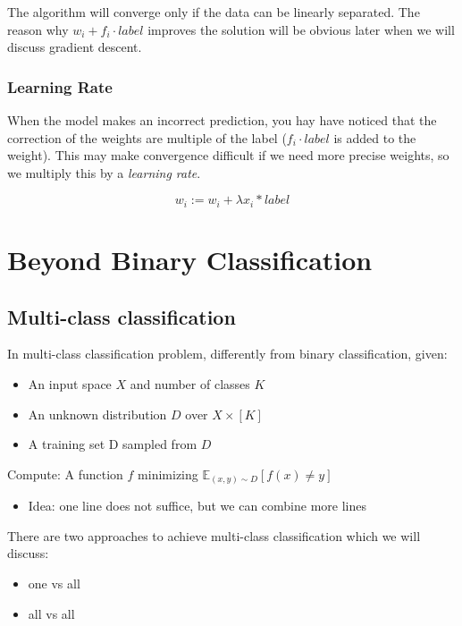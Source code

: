 \documentclass[11pt]{article}
\begin{document}
The algorithm will converge only if the data can be linearly separated.
The reason why \(w_i + f_i\cdot label\) improves the solution will be
obvious later when we will discuss gradient descent.

\subsubsection{Learning Rate}\label{learning-rate}

When the model makes an incorrect prediction, you hay have noticed that
the correction of the weights are multiple of the label
(\(f_i\cdot label\) is added to the weight). This may make convergence
difficult if we need more precise weights, so we multiply this by a
\emph{learning rate}.

\[w_i:=w_i+\lambda x_i*label\]

\section{Beyond Binary
Classification}\label{beyond-binary-classification}

\subsection{Multi-class
classification}\label{multi-class-classification}

In multi-class classification problem, differently from binary
classification, given:

\begin{itemize}
\tightlist
\item
  An input space \(X\) and number of classes \(K\)
\item
  An unknown distribution \(D\) over \(X \times [K]\)
\item
  A training set D sampled from \(D\)
\end{itemize}

Compute: A function \(f\) minimizing
\(\mathbb{E}_{(x, y)\sim D}[f(x) \ne  y]\)

\begin{itemize}
\tightlist
\item
  Idea: one line does not suffice, but we can combine more lines
\end{itemize}

There are two approaches to achieve multi-class classification which we
will discuss:

\begin{itemize}
\tightlist
\item
  one vs all
\item
  all vs all
\end{itemize}
\end{document}
